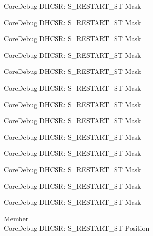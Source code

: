 \begin{DoxyRefList}
\label{deprecated__deprecated000247}%
%
Core\+Debug DHCSR\+: S\+\_\+\+RESTART\+\_\+\+ST Mask 

\label{deprecated__deprecated000304}%
%
Core\+Debug DHCSR\+: S\+\_\+\+RESTART\+\_\+\+ST Mask 

\label{deprecated__deprecated000380}%
%
Core\+Debug DHCSR\+: S\+\_\+\+RESTART\+\_\+\+ST Mask 

\label{deprecated__deprecated000459}%
%
Core\+Debug DHCSR\+: S\+\_\+\+RESTART\+\_\+\+ST Mask 

\label{deprecated__deprecated000561}%
%
Core\+Debug DHCSR\+: S\+\_\+\+RESTART\+\_\+\+ST Mask 

\label{deprecated__deprecated000667}%
%
Core\+Debug DHCSR\+: S\+\_\+\+RESTART\+\_\+\+ST Mask 

\label{deprecated__deprecated000767}%
%
Core\+Debug DHCSR\+: S\+\_\+\+RESTART\+\_\+\+ST Mask 

\label{deprecated__deprecated000821}%
%
Core\+Debug DHCSR\+: S\+\_\+\+RESTART\+\_\+\+ST Mask 

\label{deprecated__deprecated000906}%
%
Core\+Debug DHCSR\+: S\+\_\+\+RESTART\+\_\+\+ST Mask 

\label{deprecated__deprecated000963}%
%
Core\+Debug DHCSR\+: S\+\_\+\+RESTART\+\_\+\+ST Mask 

\label{deprecated__deprecated001039}%
%
Core\+Debug DHCSR\+: S\+\_\+\+RESTART\+\_\+\+ST Mask 

\label{deprecated__deprecated001118}%
%
Core\+Debug DHCSR\+: S\+\_\+\+RESTART\+\_\+\+ST Mask 

\label{deprecated__deprecated001220}%
%
Core\+Debug DHCSR\+: S\+\_\+\+RESTART\+\_\+\+ST Mask  
\item[Member \doxylink{group___c_m_s_i_s___s_c_b_gaf6498d32dbe23b8d95a12d2fbc0a65f8}{Core\+Debug\+\_\+\+DHCSR\+\_\+\+S\+\_\+\+RESTART\+\_\+\+ST\+\_\+\+Pos} ]\hfill \\
\label{deprecated__deprecated000007}%
%
Core\+Debug DHCSR\+: S\+\_\+\+RESTART\+\_\+\+ST Position 


\end{DoxyRefList}
